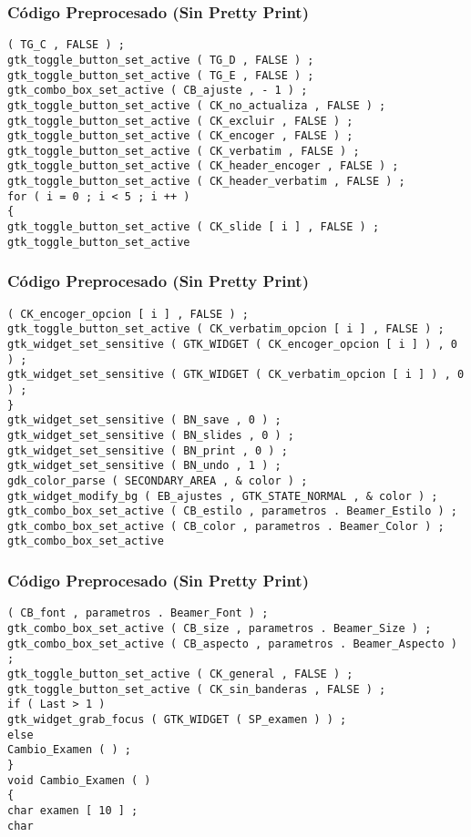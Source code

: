 \documentclass{beamer}
\begin{document}
\begin{frame}[fragile]
\frametitle{C\'odigo Preprocesado (Sin Pretty Print)}
\begin{lstlisting}[style=CStyle]
( TG_C , FALSE ) ; 
gtk_toggle_button_set_active ( TG_D , FALSE ) ; 
gtk_toggle_button_set_active ( TG_E , FALSE ) ; 
gtk_combo_box_set_active ( CB_ajuste , - 1 ) ; 
gtk_toggle_button_set_active ( CK_no_actualiza , FALSE ) ; 
gtk_toggle_button_set_active ( CK_excluir , FALSE ) ; 
gtk_toggle_button_set_active ( CK_encoger , FALSE ) ; 
gtk_toggle_button_set_active ( CK_verbatim , FALSE ) ; 
gtk_toggle_button_set_active ( CK_header_encoger , FALSE ) ; 
gtk_toggle_button_set_active ( CK_header_verbatim , FALSE ) ; 
for ( i = 0 ; i < 5 ; i ++ ) 
{ 
gtk_toggle_button_set_active ( CK_slide [ i ] , FALSE ) ; 
gtk_toggle_button_set_active \end{lstlisting}
\end{frame}
\begin{frame}[fragile]
\frametitle{C\'odigo Preprocesado (Sin Pretty Print)}
\begin{lstlisting}[style=CStyle]
( CK_encoger_opcion [ i ] , FALSE ) ; 
gtk_toggle_button_set_active ( CK_verbatim_opcion [ i ] , FALSE ) ; 
gtk_widget_set_sensitive ( GTK_WIDGET ( CK_encoger_opcion [ i ] ) , 0 ) ; 
gtk_widget_set_sensitive ( GTK_WIDGET ( CK_verbatim_opcion [ i ] ) , 0 ) ; 
} 
gtk_widget_set_sensitive ( BN_save , 0 ) ; 
gtk_widget_set_sensitive ( BN_slides , 0 ) ; 
gtk_widget_set_sensitive ( BN_print , 0 ) ; 
gtk_widget_set_sensitive ( BN_undo , 1 ) ; 
gdk_color_parse ( SECONDARY_AREA , & color ) ; 
gtk_widget_modify_bg ( EB_ajustes , GTK_STATE_NORMAL , & color ) ; 
gtk_combo_box_set_active ( CB_estilo , parametros . Beamer_Estilo ) ; 
gtk_combo_box_set_active ( CB_color , parametros . Beamer_Color ) ; 
gtk_combo_box_set_active \end{lstlisting}
\end{frame}
\begin{frame}[fragile]
\frametitle{C\'odigo Preprocesado (Sin Pretty Print)}
\begin{lstlisting}[style=CStyle]
( CB_font , parametros . Beamer_Font ) ; 
gtk_combo_box_set_active ( CB_size , parametros . Beamer_Size ) ; 
gtk_combo_box_set_active ( CB_aspecto , parametros . Beamer_Aspecto ) ; 
gtk_toggle_button_set_active ( CK_general , FALSE ) ; 
gtk_toggle_button_set_active ( CK_sin_banderas , FALSE ) ; 
if ( Last > 1 ) 
gtk_widget_grab_focus ( GTK_WIDGET ( SP_examen ) ) ; 
else 
Cambio_Examen ( ) ; 
} 
void Cambio_Examen ( ) 
{ 
char examen [ 10 ] ; 
char \end{lstlisting}
\end{frame}
\end{document}
